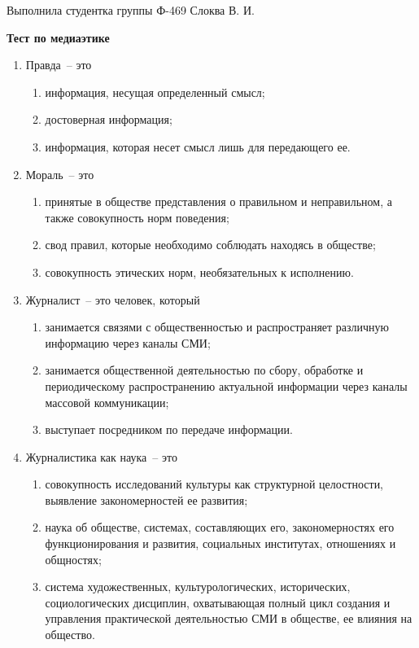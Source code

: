 \documentclass[12pt,pscyr]{hedwork}
\renewcommand{\labelenumii}{\asbuk{enumii})}
\newcommand{\itempo}{\stepcounter{enumii}\item[\bfseries\labelenumii]}
\begin{document}
  
  \begin{flushright}
    Выполнила студентка группы Ф-469 Слоква В. И.
  \end{flushright}
  \vspace{-2em}
  \begin{center}
    \bfseries Тест по медиаэтике
  \end{center}

  \begin{enumerate}
    \item Правда~-- это
      \begin{enumerate}
        \item информация, несущая определенный смысл;
        \itempo достоверная информация;
        \item информация, которая несет смысл лишь для передающего ее.
      \end{enumerate}
      
    \item Мораль~-- это
      \begin{enumerate}
        \itempo принятые в обществе представления о правильном и неправильном,
          а также совокупность норм поведения;
        \item свод правил, которые необходимо соблюдать находясь в обществе;
        \item совокупность этических норм, необязательных к исполнению.
      \end{enumerate}

    \item Журналист~-- это человек, который
      \begin{enumerate}
        \item занимается связями с общественностью и распространяет различную
          информацию через каналы СМИ;
        \itempo занимается общественной деятельностью по сбору, обработке и
          периодическому распространению актуальной информации через каналы
          массовой коммуникации;
        \item выступает посредником по передаче информации.
      \end{enumerate}

    \item Журналистика как наука~-- это
      \begin{enumerate}
        \item совокупность исследований культуры как структурной целостности,
          выявление закономерностей ее развития;
        \item наука об обществе, системах, составляющих его, закономерностях
          его функционирования и развития, социальных институтах, отношениях и
          общностях;
        \itempo система художественных, культурологических, исторических,
          социологических дисциплин, охватывающая полный цикл создания и
          управления практической деятельностью СМИ в обществе, ее влияния
          на общество.
      \end{enumerate}


\end{enumerate}
\end{document}
